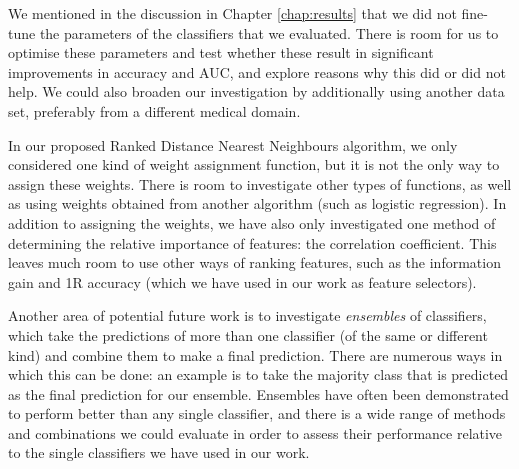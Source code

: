 We mentioned in the discussion in Chapter \ref{chap:results} that we did not
fine-tune the parameters of the classifiers that we evaluated. There is room
for us to optimise these parameters and test whether these result in
significant improvements in accuracy and AUC, and explore reasons why this
did or did not help. We could also broaden our investigation by additionally
using another data set, preferably from a different medical domain.

In our proposed Ranked Distance Nearest Neighbours algorithm, we only considered
one kind of weight assignment function, but it is not the only way to assign
these weights. There is room to investigate other types of functions, as well
as using weights obtained from another algorithm (such as logistic regression).
In addition to assigning the weights, we have also only investigated one method
of determining the relative importance of features: the correlation coefficient.
This leaves much room to use other ways of ranking features, such as the
information gain and 1R accuracy (which we have used in our work as feature
selectors).

Another area of potential future work is to investigate \textit{ensembles} of
classifiers, which take the predictions of more than one classifier (of the
same or different kind) and combine them to make a final prediction. There are
numerous ways in which this can be done: an example is to take the majority
class that is predicted as the final prediction for our ensemble. Ensembles
have often been demonstrated to perform better than any single classifier,
and there is a wide range of methods and combinations we could evaluate in
order to assess their performance relative to the single classifiers we have
used in our work.
